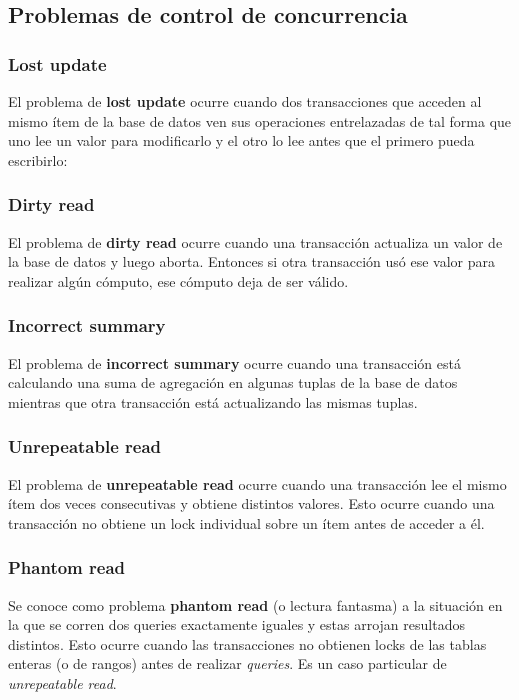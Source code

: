 \documentclass[]{article}
\begin{document}
\subsection{Problemas de control de concurrencia}
\subsubsection{Lost update}
El problema de \textbf{lost update} ocurre cuando dos transacciones que acceden al mismo ítem de la base de datos ven sus operaciones entrelazadas de tal forma que uno lee un valor para modificarlo y el otro lo lee antes que el primero pueda escribirlo:



\subsubsection{Dirty read}
El problema de \textbf{dirty read} ocurre cuando una transacción actualiza un valor de la base de datos y luego aborta. Entonces si otra transacción usó ese valor para realizar algún cómputo, ese cómputo deja de ser válido.



\subsubsection{Incorrect summary}
El problema de \textbf{incorrect summary} ocurre cuando una transacción está calculando una suma de agregación en algunas tuplas de la base de datos mientras que otra transacción está actualizando las mismas tuplas.



\subsubsection{Unrepeatable read}
El problema de \textbf{unrepeatable read} ocurre cuando una transacción lee el mismo ítem dos veces consecutivas y obtiene distintos valores. Esto ocurre cuando una transacción no obtiene un lock individual sobre un ítem antes de acceder a él.


\subsubsection{Phantom read}
Se conoce como problema \textbf{phantom read} (o lectura fantasma) a la situación en la que se corren dos queries exactamente iguales y estas arrojan resultados distintos. Esto ocurre cuando las transacciones no obtienen locks de las tablas enteras (o de rangos) antes de realizar \emph{queries}. Es un caso particular de \emph{unrepeatable read}.
\end{document}
